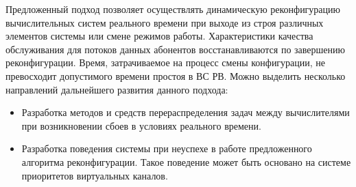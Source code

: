 \documentclass[12pt, a4paper]{article}
\begin{document}
Предложенный подход позволяет осуществлять динамическую реконфигурацию вычислительных систем реального времени при выходе из строя различных элементов системы или смене режимов работы. Характеристики качества обслуживания для потоков данных абонентов восстанавливаются по завершению реконфигурации. Время, затрачиваемое на процесс смены конфигурации, не превосходит допустимого времени простоя в ВС РВ. Можно выделить несколько направлений дальнейшего развития данного подхода:
\begin{itemize}
	\item Разработка методов и средств перераспределения задач между вычислителями при возникновении сбоев в условиях реального времени.
	\item  Разработка поведения системы при неуспехе в работе предложенного алгоритма реконфигурации. Такое поведение может быть основано на системе приоритетов виртуальных каналов.
\end{itemize}
\end{document}
